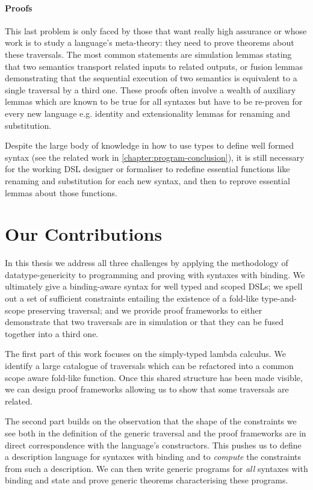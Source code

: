 \paragraph{Proofs} This last problem is only faced by those that want really high assurance or whose
work is to study a language's meta-theory: they need to prove theorems about these
traversals. The most common statements are simulation lemmas stating that two
semantics transport related inputs to related outputs, or fusion lemmas demonstrating
that the sequential execution of two semantics is equivalent to a single traversal
by a third one. These proofs often involve a wealth of auxiliary lemmas which are
known to be true for all syntaxes but have to be re-proven for every new language
e.g. identity and extensionality lemmas for renaming and substitution.

Despite the large body of knowledge in how to use types to define well formed
syntax (see the related work in \cref{chapter:program-conclusion}), it is still
necessary for the working DSL designer or formaliser to redefine essential
functions like renaming and substitution for each new syntax, and then to
reprove essential lemmas about those functions.

\section{Our Contributions}

In this thesis we address all three challenges by applying the methodology of
datatype-genericity to programming and proving with syntaxes with binding.
We ultimately give a binding-aware syntax for well typed and scoped DSLs; we
spell out a set of sufficient constraints entailing the existence of a fold-like
type-and-scope preserving traversal; and we provide proof frameworks
to either demonstrate that two traversals are in simulation or that they can be
fused together into a third one.

The first part of this work focuses on the simply-typed lambda calculus. We
identify a large catalogue of traversals which can be refactored into a common
scope aware fold-like function. Once this shared structure has been made
visible, we can design proof frameworks allowing us to show that some traversals
are related.

The second part builds on the observation that the shape of the constraints we
see both in the definition of the generic traversal and the proof frameworks
are in direct correspondence with the language's constructors. This pushes us
to define a description language for syntaxes with binding and to \emph{compute}
the constraints from such a description. We can then write generic programs for
\emph{all} syntaxes with binding and state and prove generic theorems characterising
these programs.

